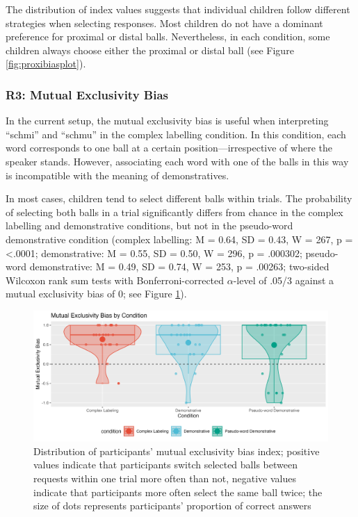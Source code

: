\documentclass[
  man,floatsintext]{apa6}
\begin{document}
The distribution of index values suggests that individual children follow different strategies when selecting responses. Most children do not have a dominant preference for proximal or distal balls. Nevertheless, in each condition, some children always choose either the proximal or distal ball (see Figure \ref{fig:proxibiasplot}).

\subsubsection{R3: Mutual Exclusivity Bias}\label{r3-mutual-exclusivity-bias}

In the current setup, the mutual exclusivity bias is useful when interpreting ``schmi'' and ``schmu'' in the complex labelling condition. In this condition, each word corresponds to one ball at a certain position---irrespective of where the speaker stands. However, associating each word with one of the balls in this way is incompatible with the meaning of demonstratives.

In most cases, children tend to select different balls within trials. The probability of selecting both balls in a trial significantly differs from chance in the complex labelling and demonstrative conditions, but not in the pseudo-word demonstrative condition (complex labelling: M = 0.64, SD = 0.43, W = 267, p = \textless.0001; demonstrative: M = 0.55, SD = 0.50, W = 296, p = .000302; pseudo-word demonstrative: M = 0.49, SD = 0.74, W = 253, p = .00263; two-sided Wilcoxon rank sum tests with Bonferroni-corrected \(\alpha\)-level of .05/3 against a mutual exclusivity bias of 0; see Figure \ref{fig:disjubiasplot}).

\begin{figure}
\centering
\includegraphics{images/figure4_disjubiasplot.png}
\caption{\label{fig:disjubiasplot}Distribution of participants' mutual exclusivity bias index; positive values indicate that participants switch selected balls between requests within one trial more often than not, negative values indicate that participants more often select the same ball twice; the size of dots represents participants' proportion of correct answers}
\end{figure}
\end{document}
